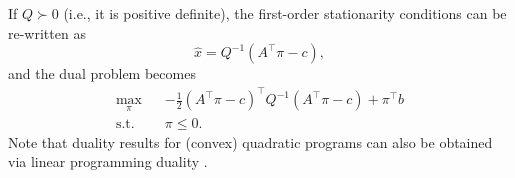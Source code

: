 \documentclass{article}
\begin{document}
If $Q \succ 0$ (i.e., it is positive definite), the first-order stationarity conditions can be re-written as
\begin{equation*}
\hat{x} = Q^{-1}(A^\top \pi - c),
\end{equation*}
and the dual problem becomes
\begin{align*}
\underset{\pi}{\max} \hspace{10pt} & -\frac{1}{2}(A^\top \pi -c)^\top Q^{-1} (A^\top \pi -c) + \pi^\top b\\
\mbox{s.t. } & \pi \le 0.
\end{align*}
Note that duality results for (convex) quadratic programs can also be obtained via linear programming duality \cite{Dorn1960}.


\end{document}
